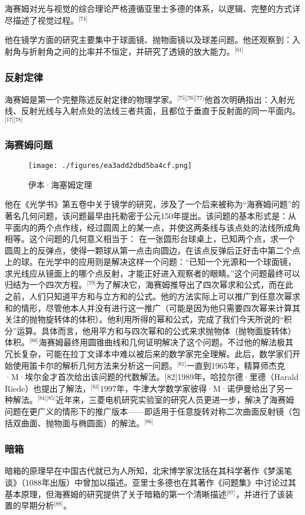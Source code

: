 海赛姆对光与视觉的综合理论严格遵循亚里士多德的体系，以逻辑、完整的方式详尽描述了视觉过程。\(^\text{[74]}\)

他在镜学方面的研究主要集中于球面镜、抛物面镜以及球差问题。他还观察到：入射角与折射角之间的比率并不恒定，并研究了透镜的放大能力。\(^\text{[61]}\)
\subsubsection{反射定律}
海赛姆是第一个完整陈述反射定律的物理学家。\(^\text{[75][76][77]}\)他首次明确指出：入射光线、反射光线与入射点处的法线三者共面，且都位于垂直于反射面的同一平面内。\(^\text{[17][78]}\)
\subsubsection{海赛姆问题}
\begin{figure}[ht]
\centering
\texttt{[image: ./figures/ea3add2dbd5ba4cf.png]}
\caption{伊本·海塞姆定理} \label{fig_YBH_3}
\end{figure}
他在《光学书》第五卷中关于镜学的研究，涉及了一个后来被称为“海赛姆问题”的著名几何问题，该问题最早由托勒密于公元150年提出。该问题的基本形式是：从平面内的两个点作线，经过圆周上的某一点，并使这两条线与该点处的法线所成角相等。这个问题的几何意义相当于：
在一张圆形台球桌上，已知两个点，求一个圆周上的反弹点，使得一颗球从第一点击向圆边，在该点反弹后正好击中第二个点上的球。在光学中的应用则是解决这样一个问题：“已知一个光源和一个球面镜，求光线应从镜面上的哪个点反射，才能正好进入观察者的眼睛。”这个问题最终可以归结为一个四次方程。\(^\text{[79]}\)为了解决它，海赛姆推导出了四次幂求和公式，而在此之前，人们只知道平方和与立方和的公式。他的方法实际上可以推广到任意次幂求和的情形，尽管他本人并没有进行这一推广（可能是因为他只需要四次幂来计算其关注的抛物旋转体的体积）。他利用所得的幂和公式，完成了我们今天所说的“积分”运算。具体而言，他用平方和与四次幂和的公式来求抛物体（抛物面旋转体）体积。\(^\text{[80]}\)海赛姆最终用圆锥曲线和几何证明解决了这个问题。不过他的解法极其冗长复杂，可能在拉丁文译本中难以被后来的数学家完全理解。此后，数学家们开始使用笛卡尔的解析几何方法来分析这一问题。\(^\text{[81]}\)一直到1965年，精算师杰克·M·埃尔金才首次给出该问题的代数解法。[82]1989年，哈拉尔德·里德（Harald Riede）也提出了解法，\(^\text{[83]}\)1997年，牛津大学数学家彼得·M·诺伊曼给出了另一种解法。\(^\text{[84][85]}\)近年来，三菱电机研究实验室的研究人员更进一步，解决了海赛姆问题在更广义的情形下的推广版本——即适用于任意旋转对称二次曲面反射镜（包括双曲面、抛物面与椭圆面）的解法。\(^\text{[86]}\)
\subsubsection{暗箱}
暗箱的原理早在中国古代就已为人所知，北宋博学家沈括在其科学著作《梦溪笔谈》（1088年出版）中曾加以描述。亚里士多德也在其著作《问题集》中讨论过其基本原理，但海赛姆的研究提供了关于暗箱的第一个清晰描述\(^\text{[87]}\)，并进行了该装置的早期分析\(^\text{[88]}\)。

